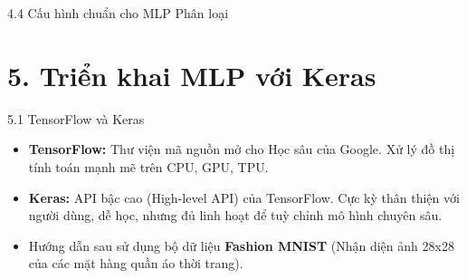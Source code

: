 \documentclass[aspectratio=169, 12pt]{beamer}
\begin{document}
\begin{frame}{4.4 Cấu hình chuẩn cho MLP Phân loại}
    \begin{table}[]
        \centering
        \caption{Hình 10-9: Kiến trúc MLP Phân loại chuẩn}
    \end{table}
\end{frame}


\section{5. Triển khai MLP với Keras}

\begin{frame}{5.1 TensorFlow và Keras}
    \begin{itemize}
        \item \textbf{TensorFlow:} Thư viện mã nguồn mở cho Học sâu của Google. Xử lý đồ thị tính toán mạnh mẽ trên CPU, GPU, TPU.
        \item \textbf{Keras:} API bậc cao (High-level API) của TensorFlow. Cực kỳ thân thiện với người dùng, dễ học, nhưng đủ linh hoạt để tuỳ chỉnh mô hình chuyên sâu.
        \item Hướng dẫn sau sử dụng bộ dữ liệu \textbf{Fashion MNIST} (Nhận diện ảnh 28x28 của các mặt hàng quần áo thời trang).
    \end{itemize}
\end{frame}
\end{document}

